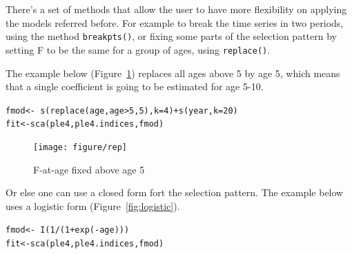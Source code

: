 \documentclass[a4paper,english,10pt]{article}\usepackage[]{graphicx}\usepackage[]{color}
\makeatletter
\newcommand{\hlnum}[1]{\textcolor[rgb]{0.2,0.2,0.2}{#1}}%
\newcommand{\hlopt}[1]{\textcolor[rgb]{0.2,0.2,0.2}{#1}}%
\newcommand{\hlstd}[1]{\textcolor[rgb]{0,0,0}{#1}}%
\newcommand{\hlkwb}[1]{\textcolor[rgb]{0.361,0.506,0.596}{#1}}%
\newcommand{\hlkwc}[1]{\textcolor[rgb]{0.361,0.506,0.596}{#1}}%
\newcommand{\hlkwd}[1]{\textcolor[rgb]{0.361,0.506,0.596}{#1}}%
\newenvironment{kframe}{%
 \def\at@end@of@kframe{}%
 \ifinner\ifhmode%
  \def\at@end@of@kframe{\end{minipage}}%
  \begin{minipage}{\columnwidth}%
 \fi\fi%
 \def\FrameCommand##1{\hskip\@totalleftmargin \hskip-\fboxsep
 \colorbox{shadecolor}{##1}\hskip-\fboxsep
     \hskip-\linewidth \hskip-\@totalleftmargin \hskip\columnwidth}%
 \MakeFramed {\advance\hsize-\width
   \@totalleftmargin\z@ \linewidth\hsize
   \@setminipage}}%
 {\par\unskip\endMakeFramed%
 \at@end@of@kframe}
\newenvironment{knitrout}{}{} %
\newcommand{\code}[1]{{\texttt{#1}}}
\makeatother
\begin{document}
There's a set of methods that allow the user to have more flexibility on applying the models referred before. For example to break the time series in two periods, using the method \code{breakpts()}, or fixing some parts of the selection pattern by setting F to be the same for a group of ages, using \code{replace()}.

The example below (Figure~\ref{fig:rep}) replaces all ages above 5 by age 5, which means that a single coefficient is going to be estimated for age 5-10.

\begin{knitrout}
\color{fgcolor}\begin{kframe}
\begin{alltt}
\hlstd{fmod} \hlkwb{<-} \hlopt{~} \hlkwd{s}\hlstd{(}\hlkwd{replace}\hlstd{(age, age}\hlopt{>}\hlnum{5}\hlstd{,} \hlnum{5}\hlstd{),} \hlkwc{k}\hlstd{=}\hlnum{4}\hlstd{)} \hlopt{+} \hlkwd{s}\hlstd{(year,} \hlkwc{k}\hlstd{=}\hlnum{20}\hlstd{)}
\hlstd{fit} \hlkwb{<-} \hlkwd{sca}\hlstd{(ple4, ple4.indices, fmod)}
\end{alltt}
\end{kframe}
\end{knitrout}

\begin{knitrout}
\color{fgcolor}\begin{figure}[H]


{\centering \texttt{[image: figure/rep]} 

}

\caption[F-at-age fixed above age 5]{F-at-age fixed above age 5\label{fig:rep}}
\end{figure}


\end{knitrout}

Or else one can use a closed form fort the selection pattern. The example below uses a logistic form (Figure~\ref{fig:logistic}).

\begin{knitrout}
\color{fgcolor}\begin{kframe}
\begin{alltt}
\hlstd{fmod} \hlkwb{<-} \hlopt{~} \hlkwd{I}\hlstd{(}\hlnum{1}\hlopt{/}\hlstd{(}\hlnum{1}\hlopt{+}\hlkwd{exp}\hlstd{(}\hlopt{-}\hlstd{age)))}
\hlstd{fit} \hlkwb{<-} \hlkwd{sca}\hlstd{(ple4, ple4.indices, fmod)}
\end{alltt}
\end{kframe}
\end{knitrout}
\end{document}
